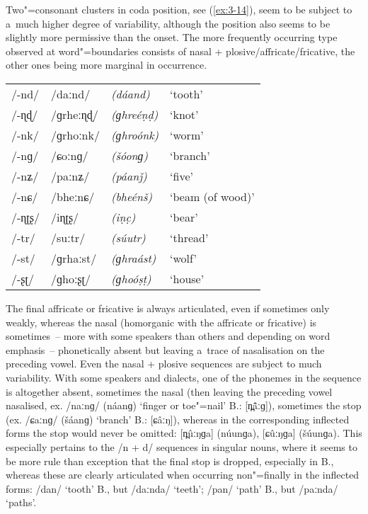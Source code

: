 Two"=consonant clusters in coda position, see (\ref{ex:3-14}), seem to be subject to a~much higher degree of variability, although the position also seems to be slightly more permissive than the onset. The more frequently occurring type observed at word"=boundaries consists of nasal + plosive/affricate/fricative, the other ones being more marginal in occurrence. 


\begin{exe}
\extab
\label{ex:3-14}
\begin{tabular}{ l l l l }
/-nd/ &
/daːnd/ &
\textit{(dáand)} &
`tooth'\\
/-ɳɖ/ &
/ɡrheːɳɖ/ &
\textit{(ɡhreéṇḍ)} &
`knot'\\
/-nk/ &
/ɡrhoːnk/ &
\textit{(ɡhroónk)} &
`worm'\\
/-nɡ/ &
/ɕoːnɡ/ &
\textit{(šóonɡ) } &
`branch'\\
/-nʑ/ &
/paːnʑ/ &
\textit{(páanǰ) } &
`five' \\
/-nɕ/ &
/bheːnɕ/ &
\textit{(bheénš) } &
`beam (of wood)' \\
/-ɳʈʂ/ &
/iɳʈʂ/ &
\textit{(iṇc̣) } &
`bear' \\
/-tr/ &
/suːtr/ &
\textit{(súutr)} &
`thread' \\
/-st/ &
/ɡrhaːst/ &
\textit{(ɡhraást)} &
`wolf' \\
/-ʂʈ/ &
/ɡhoːʂʈ/ &
\textit{(ɡhoóṣṭ) } &
`house'\\
\end{tabular}
\end{exe}


The final affricate or fricative is always articulated, even if sometimes only weakly, whereas the
nasal (homorganic with the affricate or fricative) is sometimes~-- more with some speakers than
others and depending on word emphasis~-- phonetically absent but leaving a~trace of nasalisation on
the preceding vowel. Even the nasal + plosive sequences are subject to much variability. With some
speakers and dialects, one of the phonemes in the sequence is altogether absent, sometimes the nasal
(then leaving the preceding vowel nasalised, ex. /naːnɡ/
(náanɡ) `finger or toe"=nail' B.: [n̪\^{ã}ːɡ]), sometimes the stop (ex. /ɕaːnɡ/ (\v{s}áanɡ)
`branch' B.: [ɕâːŋ]), whereas in the corresponding inflected forms the stop would never be
omitted: [n̪ûːŋɡa] (núunɡa), [ɕûːŋɡa]
(\v{s}úunɡa). This especially pertains to the /n +
d/ sequences in singular nouns, where it seems to be more rule than exception that the final stop is dropped, especially in B., whereas these are clearly articulated when occurring non"=finally in the inflected forms: /dan/ `tooth' B., but /daːnda/ `teeth'; /pan/ `path' B., but /paːnda/ `paths'.


